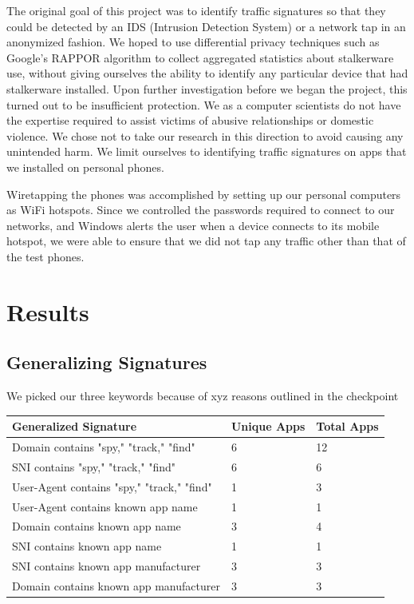 \documentclass[acmtog]{acmart}
\begin{document}
The original goal of this project was to identify traffic signatures so that 
they could be detected by an IDS (Intrusion Detection System) or a network 
tap in an anonymized fashion. We hoped to use differential privacy techniques 
such as Google's RAPPOR algorithm \cite{erlingsson_rappor:_2014} to collect 
aggregated statistics about stalkerware use, without giving ourselves the 
ability to identify any particular device that had stalkerware installed. Upon 
further investigation before we began the project, this turned out to be 
insufficient protection. We as a computer 
scientists do not have the expertise required to assist victims of abusive 
relationships or domestic violence. We chose not to take our research in this 
direction to avoid causing any unintended harm. We limit ourselves to 
identifying traffic signatures on apps that we installed on personal phones.

Wiretapping the phones was accomplished by setting up our personal computers as 
WiFi hotspots. Since we controlled the passwords required to connect to our 
networks, and Windows alerts the user when a device connects to its mobile 
hotspot, we were able to ensure that we did not tap any traffic other than that 
of the test phones. 
\section{Results}

\subsection{Generalizing Signatures}

We picked our three keywords because of xyz reasons outlined in the checkpoint

\begin{table}
	\begin{tabular}{p{5cm}p{5cm}p{5cm}}
		\toprule
		Generalized Signature & Unique Apps & Total Apps \\
		\hline
		Domain contains "spy," "track," "find" & 6 & 12 \\
		SNI contains "spy," "track," "find" & 6 & 6 \\
		User-Agent contains "spy," "track," "find" & 1 & 3 \\
		User-Agent contains known app name & 1 & 1 \\
		Domain contains known app name & 3 & 4 \\
		SNI contains known app name & 1 & 1 \\
		SNI contains known app manufacturer & 3 & 3 \\
		Domain contains known app manufacturer & 3 & 3 \\
		\midrule
	\end{tabular}
\end{table}
\end{document}
